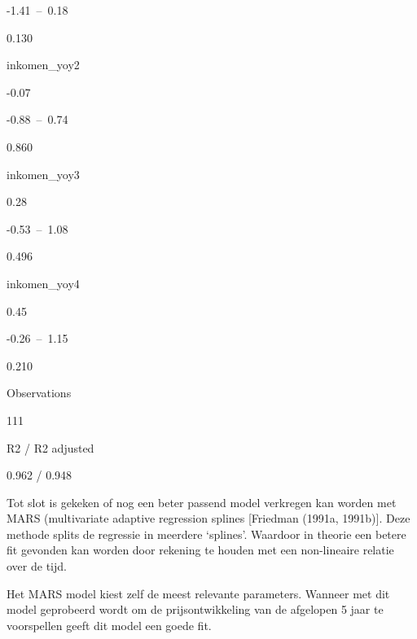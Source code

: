 \documentclass[
]{article}
\begin{document}
-1.41~--~0.18

0.130

inkomen\_yoy2

-0.07

-0.88~--~0.74

0.860

inkomen\_yoy3

0.28

-0.53~--~1.08

0.496

inkomen\_yoy4

0.45

-0.26~--~1.15

0.210

Observations

111

R2 / R2 adjusted

0.962 / 0.948

Tot slot is gekeken of nog een beter passend model verkregen kan worden
met MARS (multivariate adaptive regression splines {[}Friedman (1991a,
1991b){]}. Deze methode splits de regressie in meerdere `splines'.
Waardoor in theorie een betere fit gevonden kan worden door rekening te
houden met een non-lineaire relatie over de tijd.

Het MARS model kiest zelf de meest relevante parameters. Wanneer met dit
model geprobeerd wordt om de prijsontwikkeling van de afgelopen 5 jaar
te voorspellen geeft dit model een goede fit.
\end{document}
